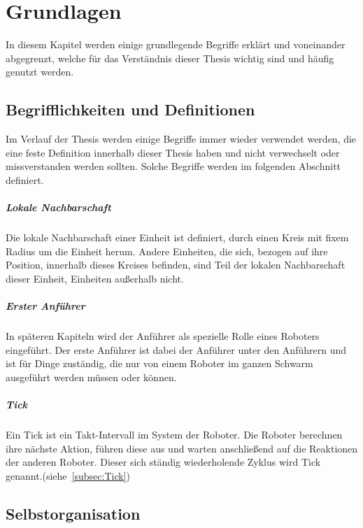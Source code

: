 \chapter{Grundlagen}\label{ch:Grundlagen}

In diesem Kapitel werden einige grundlegende Begriffe erklärt und voneinander abgegrenzt, welche für das Verständnis dieser Thesis wichtig sind und häufig genutzt werden.

\section{Begrifflichkeiten und Definitionen}\label{Definitionen}

Im Verlauf der Thesis werden einige Begriffe immer wieder verwendet werden, die eine feste Definition innerhalb dieser Thesis haben und nicht verwechselt oder missverstanden werden sollten. Solche Begriffe werden im folgenden Abschnitt definiert.

\paragraph*{Lokale Nachbarschaft}
Die lokale Nachbarschaft einer Einheit ist definiert, durch einen Kreis mit fixem Radius um die Einheit herum. Andere Einheiten, die sich, bezogen auf ihre Position, innerhalb dieses Kreises befinden, sind Teil der lokalen Nachbarschaft dieser Einheit, Einheiten außerhalb nicht.

\paragraph*{Erster Anführer}
In späteren Kapiteln wird der Anführer als spezielle Rolle eines Roboters eingeführt. Der erste Anführer ist dabei der Anführer unter den Anführern und ist für Dinge zuständig, die nur von einem Roboter im ganzen Schwarm ausgeführt werden müssen oder können.

\paragraph*{Tick}
Ein Tick ist ein Takt-Intervall im System der Roboter. Die Roboter berechnen ihre nächste Aktion, führen diese aus und warten anschließend auf die Reaktionen der anderen Roboter. Dieser sich ständig wiederholende Zyklus wird Tick genannt.(siehe~\autoref{subsec:Tick})

\section{Selbstorganisation}\label{sec:Selbstorganisation}

